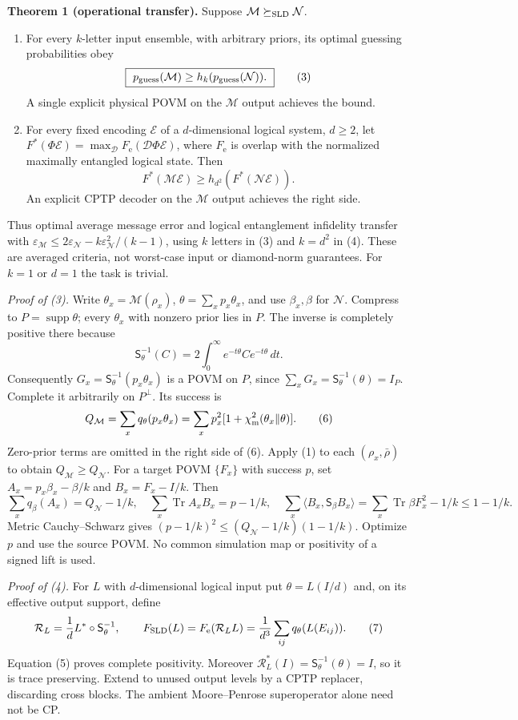 \documentclass[10pt,a4paper]{article}
\newcommand{\Tr}{\operatorname{Tr}}
\newcommand{\supp}{\operatorname{supp}}
\newcommand{\N}{\mathcal N}
\newcommand{\M}{\mathcal M}
\newcommand{\Sld}{\mathsf S}
\newcommand{\Fe}{F_{\mathrm e}}
\begin{document}
\textbf{Theorem 1 (operational transfer).} Suppose $\M\succeq_{\rm SLD}\N$.
\begin{enumerate}
\item For every $k$-letter input ensemble, with arbitrary priors, its optimal guessing probabilities obey
\[
 \boxed{\ p_{\rm guess}(\M)\ge h_k(p_{\rm guess}(\N)).\ } \tag{3}
\]
A single explicit physical POVM on the $\M$ output achieves the bound.
\item For every fixed encoding $\mathcal E$ of a $d$-dimensional logical system, $d\ge2$, let $F^*(\Phi\mathcal E)=\max_{\mathcal D}\Fe(\mathcal D\Phi\mathcal E)$, where $\Fe$ is overlap with the normalized maximally entangled logical state. Then
\[
 \boxed{\ F^*(\M\mathcal E)\ge h_{d^2}(F^*(\N\mathcal E)).\ } \tag{4}
\]
An explicit CPTP decoder on the $\M$ output achieves the right side.
\end{enumerate}
Thus optimal average message error and logical entanglement infidelity transfer with
$\varepsilon_\M\le2\varepsilon_\N-k\varepsilon_\N^2/(k-1)$, using $k$ letters in (3) and $k=d^2$ in (4). These are averaged criteria, not worst-case input or diamond-norm guarantees. For $k=1$ or $d=1$ the task is trivial.

\textit{Proof of (3).} Write $\theta_x=\M(\rho_x)$, $\theta=\sum_xp_x\theta_x$, and use $\beta_x,\beta$ for $\N$. Compress to $P=\supp\theta$; every $\theta_x$ with nonzero prior lies in $P$. The inverse is completely positive there because
\[
 \Sld_\theta^{-1}(C)=2\int_0^\infty e^{-t\theta}C e^{-t\theta}\,dt. \tag{5}
\]
Consequently $G_x=\Sld_\theta^{-1}(p_x\theta_x)$ is a POVM on $P$, since $\sum_xG_x=\Sld_\theta^{-1}(\theta)=I_P$. Complete it arbitrarily on $P^\perp$. Its success is
\[
 Q_\M=\sum_xq_\theta(p_x\theta_x)
 =\sum_xp_x^2[1+\chi^2_{\rm m}(\theta_x\|\theta)]. \tag{6}
\]
Zero-prior terms are omitted in the right side of (6). Apply (1) to each $(\rho_x,\bar\rho)$ to obtain $Q_\M\ge Q_\N$.
For a target POVM $\{F_x\}$ with success $p$, set $A_x=p_x\beta_x-\beta/k$ and $B_x=F_x-I/k$. Then
\[
 \sum_xq_\beta(A_x)=Q_\N-1/k,\quad
 \sum_x\Tr A_xB_x=p-1/k,\quad
 \sum_x\langle B_x,\Sld_\beta B_x\rangle
 =\sum_x\Tr\beta F_x^2-1/k\le1-1/k.
\]
Metric Cauchy--Schwarz gives $(p-1/k)^2\le(Q_\N-1/k)(1-1/k)$. Optimize $p$ and use the source POVM. No common simulation map or positivity of a signed lift is used.

\textit{Proof of (4).} For $L$ with $d$-dimensional logical input put $\theta=L(I/d)$ and, on its effective output support, define
\[
 \mathcal R_L=\frac1dL^*\circ\Sld_\theta^{-1},\qquad
 F_{\rm SLD}(L)=\Fe(\mathcal R_LL)
 =\frac1{d^3}\sum_{ij}q_\theta(L(E_{ij})). \tag{7}
\]
Equation (5) proves complete positivity. Moreover $\mathcal R_L^*(I)=\Sld_\theta^{-1}(\theta)=I$, so it is trace preserving. Extend to unused output levels by a CPTP replacer, discarding cross blocks. The ambient Moore--Penrose superoperator alone need not be CP.
\end{document}
